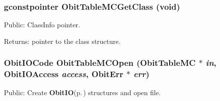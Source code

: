 \subsubsection{\setlength{\rightskip}{0pt plus 5cm}gconstpointer Obit\-Table\-MCGet\-Class (void)}\label{ObitTableMC_8h_a13}


Public: Class\-Info pointer. 

\begin{Desc}
\item[Returns:]pointer to the class structure. \end{Desc}
\subsubsection{\setlength{\rightskip}{0pt plus 5cm}Obit\-IOCode Obit\-Table\-MCOpen ({\bf Obit\-Table\-MC} $\ast$ {\em in}, Obit\-IOAccess {\em access}, {\bf Obit\-Err} $\ast$ {\em err})}\label{ObitTableMC_8h_a17}


Public: Create {\bf Obit\-IO}{\rm (p.\,\pageref{structObitIO})} structures and open file. 

